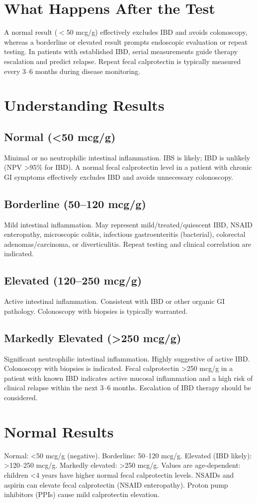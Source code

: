 \section*{What Happens After the Test}
A normal result ($<$50 mcg/g) effectively excludes IBD and avoids colonoscopy, whereas a borderline or elevated result prompts endoscopic evaluation or repeat testing. In patients with established IBD, serial measurements guide therapy escalation and predict relapse. Repeat fecal calprotectin is typically measured every 3--6 months during disease monitoring.
\section*{Understanding Results}
\subsection*{Normal (<50 mcg/g)}
Minimal or no neutrophilic intestinal inflammation. IBS is likely; IBD is unlikely (NPV >95\% for IBD). A normal fecal calprotectin level in a patient with chronic GI symptoms effectively excludes IBD and avoids unnecessary colonoscopy.
\subsection*{Borderline (50--120 mcg/g)}
Mild intestinal inflammation. May represent mild/treated/quiescent IBD, NSAID enteropathy, microscopic colitis, infectious gastroenteritis (bacterial), colorectal adenomas/carcinoma, or diverticulitis. Repeat testing and clinical correlation are indicated.
\subsection*{Elevated (120--250 mcg/g)}
Active intestinal inflammation. Consistent with IBD or other organic GI pathology. Colonoscopy with biopsies is typically warranted.
\subsection*{Markedly Elevated (>250 mcg/g)}
Significant neutrophilic intestinal inflammation. Highly suggestive of active IBD. Colonoscopy with biopsies is indicated. Fecal calprotectin >250 mcg/g in a patient with known IBD indicates active mucosal inflammation and a high risk of clinical relapse within the next 3--6 months. Escalation of IBD therapy should be considered.
\section*{Normal Results}
Normal: <50 mcg/g (negative). Borderline: 50--120 mcg/g. Elevated (IBD likely): >120--250 mcg/g. Markedly elevated: >250 mcg/g. Values are age-dependent: children <4 years have higher normal fecal calprotectin levels. NSAIDs and aspirin can elevate fecal calprotectin (NSAID enteropathy). Proton pump inhibitors (PPIs) cause mild calprotectin elevation.
